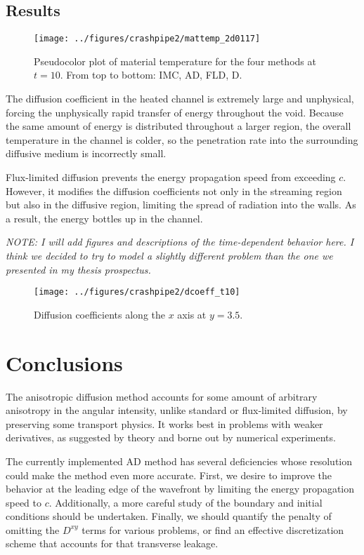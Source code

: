 \documentclass[11pt,letter,twoside]{mc2011}
\begin{document}
\subsection{Results}

\begin{figure}[htb]
  \centering
  \texttt{[image: ../figures/crashpipe2/mattemp\_2d0117]}
  \caption{Pseudocolor plot of material temperature for the four methods at
  $t=10$. From top to bottom: IMC, AD, FLD, D.}
  \label{fig:mattemp}
\end{figure}

The diffusion coefficient in the heated channel is extremely large and
unphysical, forcing the unphysically rapid transfer of energy throughout the
void. Because the same amount of energy is distributed throughout a larger
region, the overall temperature in the channel is colder, so the penetration
rate into the surrounding diffusive medium is incorrectly small.

Flux-limited diffusion prevents the energy propagation speed from exceeding $c$.
However, it modifies the diffusion coefficients not only in the streaming
region but also in the diffusive region, limiting the spread of radiation into
the walls. As a result, the energy bottles up in the channel.

\emph{NOTE: I will add figures and descriptions of the time-dependent behavior
here. I think we decided to try to model a slightly different problem than the
one we presented in my thesis prospectus.}

\begin{figure}[htb]
  \centering
  \texttt{[image: ../figures/crashpipe2/dcoeff\_t10]}
  \caption{Diffusion coefficients along the $x$ axis at $y=3.5$.}
  \label{fig:dcoeffT10}
\end{figure}

\section{Conclusions}
The anisotropic diffusion method accounts for some amount of arbitrary
anisotropy in the angular intensity, unlike standard or flux-limited diffusion,
by preserving some transport physics. It works best in problems with weaker
derivatives, as suggested by theory and borne out by numerical experiments.

The currently implemented AD method has several deficiencies whose resolution
could make the method even more accurate. First, we desire to improve the
behavior at the leading edge of the wavefront by limiting the energy
propagation speed to $c$. Additionally, a more careful study of the boundary
and initial conditions should be undertaken. Finally, we should quantify the
penalty of omitting the $D^{xy}$ terms for various problems, or find an
effective discretization scheme that accounts for that transverse leakage.
\end{document}
